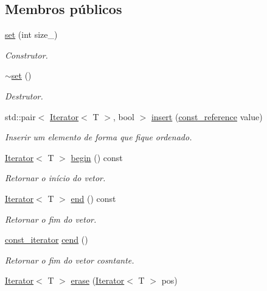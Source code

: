 \subsection*{Membros públicos}
\begin{DoxyCompactItemize}
\item 
\hyperlink{classset_ad6a5925a93ad1edd160fe52976d9b516}{set} (int size\+\_)
\begin{DoxyCompactList}\small\item\em Construtor. \end{DoxyCompactList}\item 
\hyperlink{classset_ac47084748dafcedb0535fe6509d8e4cd}{$\sim$set} ()
\begin{DoxyCompactList}\small\item\em Destrutor. \end{DoxyCompactList}\item 
std\+::pair$<$ \hyperlink{classIterator}{Iterator}$<$ T $>$, bool $>$ \hyperlink{classset_a1e5e9e97d5223668325edfb1e6c22546}{insert} (\hyperlink{classset_aaafc18d8ba5261e496a013e32b9dbe28}{const\+\_\+reference} value)
\begin{DoxyCompactList}\small\item\em Inserir um elemento de forma que fique ordenado. \end{DoxyCompactList}\item 
\hyperlink{classIterator}{Iterator}$<$ T $>$ \hyperlink{classset_a67103bfe5a350e3523f50021b2786c09}{begin} () const
\begin{DoxyCompactList}\small\item\em Retornar o início do vetor. \end{DoxyCompactList}\item 
\hyperlink{classIterator}{Iterator}$<$ T $>$ \hyperlink{classset_a9925f338794495438768190b906e4022}{end} () const
\begin{DoxyCompactList}\small\item\em Retornar o fim do vetor. \end{DoxyCompactList}\item 
\hyperlink{classset_a1a9f610c8f0dd1d2ca1af0f435e45067}{const\+\_\+iterator} \hyperlink{classset_a3c0619e697c559705bf589f70d70b807}{cend} ()
\begin{DoxyCompactList}\small\item\em Retornar o fim do vetor cosntante. \end{DoxyCompactList}\item 
\hyperlink{classIterator}{Iterator}$<$ T $>$ \hyperlink{classset_ad7fd389661e732276df21ecec7300c60}{erase} (\hyperlink{classIterator}{Iterator}$<$ T $>$ pos)

\end{DoxyCompactItemize}
